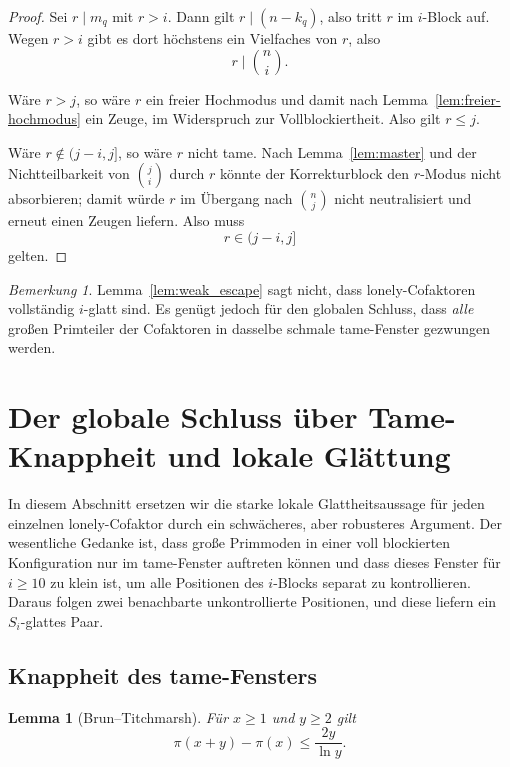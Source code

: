 \documentclass[12pt,a4paper]{article}
\theoremstyle{plain}
\newtheorem{lemma}[theorem]{Lemma}
\theoremstyle{definition}
\theoremstyle{remark}
\newtheorem{remark}[theorem]{Bemerkung}
\begin{document}
	\begin{proof}
		Sei \(r\mid m_q\) mit \(r>i\). Dann gilt \(r\mid(n-k_q)\), also tritt \(r\) im \(i\)-Block auf. Wegen \(r>i\) gibt es dort höchstens ein Vielfaches von \(r\), also
		\[
		r\mid \binom{n}{i}.
		\]
		
		Wäre \(r>j\), so wäre \(r\) ein freier Hochmodus und damit nach Lemma~\ref{lem:freier-hochmodus} ein Zeuge, im Widerspruch zur Vollblockiertheit. Also gilt \(r\le j\).
		
		Wäre \(r\notin(j-i,j]\), so wäre \(r\) nicht tame. Nach Lemma~\ref{lem:master} und der Nichtteilbarkeit von \(\binom{j}{i}\) durch \(r\) könnte der Korrekturblock den \(r\)-Modus nicht absorbieren; damit würde \(r\) im Übergang nach \(\binom{n}{j}\) nicht neutralisiert und erneut einen Zeugen liefern. Also muss
		\[
		r\in(j-i,j]
		\]
		gelten.
	\end{proof}
	
	\begin{remark}
		Lemma~\ref{lem:weak_escape} sagt nicht, dass lonely-Cofaktoren vollständig \(i\)-glatt sind. Es genügt jedoch für den globalen Schluss, dass \emph{alle} großen Primteiler der Cofaktoren in dasselbe schmale tame-Fenster gezwungen werden.
	\end{remark}
	
	\section{Der globale Schluss über Tame-Knappheit und lokale Glättung}
	
	In diesem Abschnitt ersetzen wir die starke lokale Glattheitsaussage für jeden einzelnen lonely-Cofaktor durch ein schwächeres, aber robusteres Argument. Der wesentliche Gedanke ist, dass große Primmoden in einer voll blockierten Konfiguration nur im tame-Fenster auftreten können und dass dieses Fenster für \(i\ge 10\) zu klein ist, um alle Positionen des \(i\)-Blocks separat zu kontrollieren. Daraus folgen zwei benachbarte unkontrollierte Positionen, und diese liefern ein \(S_i\)-glattes Paar.
	
	\subsection{Knappheit des tame-Fensters}
	
	\begin{lemma}[Brun--Titchmarsh]
		Für \(x\ge1\) und \(y\ge2\) gilt
		\[
		\pi(x+y)-\pi(x)\le \frac{2y}{\ln y}.
		\]
	\end{lemma}
	
\end{document}
